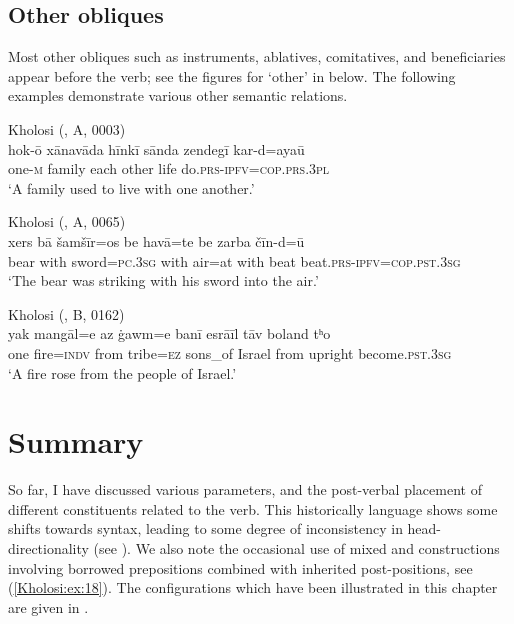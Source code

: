 \documentclass[output=paper,colorlinks,citecolor=brown]{langscibook}
\begin{document}
\subsection{Other obliques}\label{Kholosi:ss:4.8}

Most other obliques such as instruments, ablatives, comitatives, and beneficiaries appear before the verb; see the figures for `other' in  below. The following examples demonstrate various other semantic relations.

\ea\label{Kholosi:ex:42}
Kholosi (\citealt{nourzaei_kholosi_2022}, A, 0003)\\
\gll hok-ō xānavāda hīnkī sānda zendegī kar-d=ayaū \\
one\textsc{-m} family each other life do\textsc{.prs-ipfv=cop.prs.3pl} \\
\glt `A family used to live with one another.' 
\z

\ea\label{Kholosi:ex:43}
Kholosi (\citealt{nourzaei_kholosi_2022}, A, 0065)\\
\gll xers bā šamšīr=os be havā=te be zarba čīn-d=ū \\
bear with sword\textsc{=pc.3sg} with air=at with beat beat\textsc{.prs-ipfv=cop.pst.3sg} \\
\glt `The bear was striking with his sword into the air.' 
\z

\ea\label{Kholosi:ex:44}
Kholosi (\citealt{nourzaei_kholosi_2022}, B, 0162)\\
\gll yak mangāl=e az ġawm=e banī esrāīl tāv boland tʰo \\
one fire\textsc{=indv} from tribe\textsc{=ez} sons\_of {I}srael from upright become\textsc{.pst.3sg} \\
\glt `A fire rose from the people of Israel.' 
\z


\section{Summary}\label{Kholosi:ss:5}

So far, I have discussed various  parameters, and the post-verbal placement of different constituents related to the verb. This historically  language shows some shifts towards  syntax, leading to some degree of inconsistency in head-directionality (see \citealt{Dryer1992Greeburg}). We also note the occasional use of mixed  and  constructions involving borrowed prepositions combined with inherited post-positions, see (\ref{Kholosi:ex:18}). The  configurations which have been illustrated in this chapter are given in .
\end{document}
